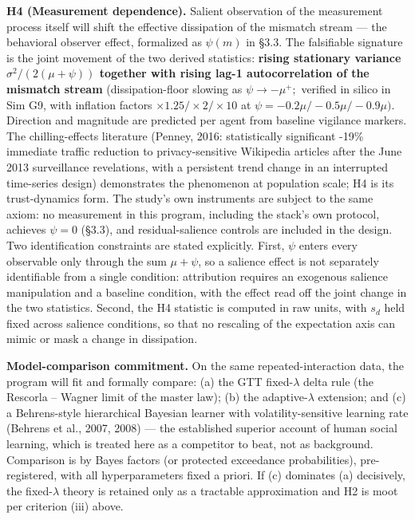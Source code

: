 \documentclass[
]{article}
\begin{document}
\textbf{H4 (Measurement dependence).} Salient observation of the
measurement process itself will shift the effective dissipation of the
mismatch stream --- the behavioral observer effect, formalized as
\(\psi(m)\) in §3.3. The falsifiable signature is the joint movement of
the two derived statistics: \textbf{rising stationary variance
\(\sigma^{2}/(2(\mu+\psi))\) together with rising lag-1 autocorrelation
of the mismatch stream} (dissipation-floor slowing as
\(\psi \to -\mu^{+};\) verified in silico in Sim G9, with inflation
factors \(\times1.25 / \times2 / \times10\) at
\(\psi = -0.2\mu / -0.5\mu / -0.9\mu).\) Direction and magnitude are
predicted per agent from baseline vigilance markers. The
chilling-effects literature (Penney, 2016: statistically significant
-19\% immediate traffic reduction to privacy-sensitive Wikipedia
articles after the June 2013 surveillance revelations, with a persistent
trend change in an interrupted time-series design) demonstrates the
phenomenon at population scale; H4 is its trust-dynamics form. The
study's own instruments are subject to the same axiom: no measurement in
this program, including the stack's own protocol, achieves \(\psi = 0\)
(§3.3), and residual-salience controls are included in the design. Two
identification constraints are stated explicitly. First, \(\psi\) enters
every observable only through the sum \(\mu + \psi\), so a salience
effect is not separately identifiable from a single condition:
attribution requires an exogenous salience manipulation and a baseline
condition, with the effect read off the joint change in the two
statistics. Second, the H4 statistic is computed in raw units, with
\(s_d\) held fixed across salience conditions, so that no rescaling of
the expectation axis can mimic or mask a change in dissipation.

\textbf{Model-comparison commitment.} On the same repeated-interaction
data, the program will fit and formally compare: (a) the GTT
fixed-\(\lambda\) delta rule (the Rescorla -- Wagner limit of the master
law); (b) the adaptive-\(\lambda\) extension; and (c) a Behrens-style
hierarchical Bayesian learner with volatility-sensitive learning rate
(Behrens et al., 2007, 2008) --- the established superior account of
human social learning, which is treated here as a competitor to beat,
not as background. Comparison is by Bayes factors (or protected
exceedance probabilities), pre-registered, with all hyperparameters
fixed a priori. If (c) dominates (a) decisively, the fixed-\(\lambda\)
theory is retained only as a tractable approximation and H2 is moot per
criterion (iii) above.
\end{document}

